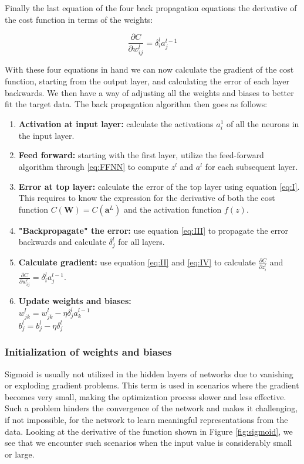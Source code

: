 \documentclass[a4paper, UKenglish, 11pt]{uiomaster}
\begin{document}
Finally the last equation of the four back propagation equations the derivative of the cost function in terms of the weights:

\begin{equation}
    \frac{\partial C}{\partial w^l_{ij}} = \delta_i^l a_j^{l-1}
\label{eq:IV}
\end{equation}

With these four equations in hand we can now calculate the gradient of the cost function, starting from the output layer, and calculating the error of each layer backwards. We then have a way of adjusting all the weights and biases to better fit the target data. The back propagation algorithm then goes as follows:

\begin{enumerate}
  \item \textbf{Activation at input layer:} calculate the activations $a_i^1$ of all the neurons in the input layer.
  \item \textbf{Feed forward:} starting with the first layer, utilize the feed-forward algorithm through \ref{eq:FFNN} to compute $z^{l}$ and $a^{l}$ for each subsequent layer.
  \item \textbf{Error at top layer:} calculate the error of the top layer using equation \ref{eq:I}. This requires to know the expression for the derivative of both the cost function $C(\boldsymbol{W}) = C(\boldsymbol{a}^L)$ and the activation function $f(z)$.
  \item \textbf{"Backpropagate" the error:} use equation \ref{eq:III} to propagate the error backwards and calculate $\delta_j^l$ for all layers.
  \item \textbf{Calculate gradient:} use equation \ref{eq:II} and \ref{eq:IV} to calculate $\frac{\partial C}{\partial z^l_{i}}$ and $\frac{\partial C}{\partial w^l_{ij}} = \delta_i^l a_j^{l-1}$. \newline
  \item \textbf{Update weights and biases:} \\[2pt] $w^l_{jk}=w^l_{jk}-\eta\delta^l_ja^{l-1}_k$ \\[2pt] $b_j^l = b_j^l - \eta \delta_j^l$
\end{enumerate}

\subsubsection{Initialization of weights and biases}

Sigmoid is usually not utilized in the hidden layers of networks due to vanishing or exploding gradient problems. This term is used in scenarios where the gradient becomes very small, making the optimization process slower and less effective. Such a problem hinders the convergence of the network and makes it challenging, if not impossible, for the network to learn meaningful representations from the data. Looking at the derivative of the function shown in Figure \ref{fig:sigmoid}, we see that we encounter such scenarios when the input value is considerably small or large.
\end{document}
